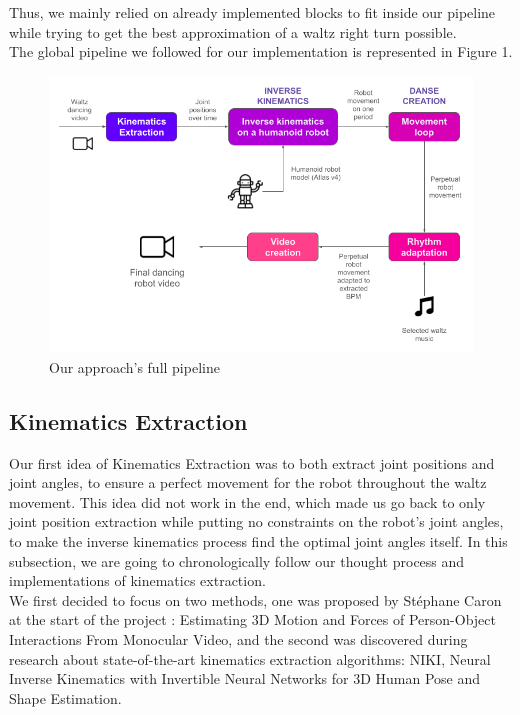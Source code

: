 \documentclass{amsart}
\theoremstyle{definition}
\theoremstyle{plain}
\begin{document}
Thus, we mainly relied on already implemented blocks to fit inside our pipeline while trying to get the best approximation of a waltz right turn possible.
\\

The global pipeline we followed for our implementation is represented in Figure 1.

\begin{figure}
  \includegraphics[width = 0.75 \columnwidth]{img/final_solution_pipeline.png}
  \caption{Our approach's full pipeline}
\end{figure}

\subsection{Kinematics Extraction}
Our first idea of Kinematics Extraction was to both extract joint positions and joint angles, to ensure a perfect movement for the robot throughout the waltz movement. This idea did not work in the end, which made us go back to only joint position extraction while putting no constraints on the robot's joint angles, to make the inverse kinematics process find the optimal joint angles itself. In this subsection, we are going to chronologically follow our thought process and implementations of kinematics extraction.
\\

We first decided to focus on two methods, one was proposed by Stéphane Caron at the start of the project : Estimating 3D Motion and Forces of Person-Object Interactions From Monocular Video\cite{Li_2019}, and the second was discovered during research about state-of-the-art kinematics extraction algorithms: NIKI, Neural Inverse Kinematics with Invertible Neural Networks for 3D Human Pose and Shape Estimation\cite{li2023niki}.
\\
\end{document}
